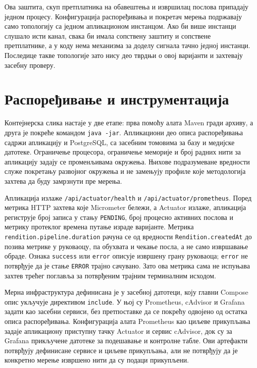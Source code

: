 \documentclass[12pt,oneside]{memoir}
\begin{document}
Ова заштита, скуп претплатника на обавештења и извршилац послова припадају
једном процесу. Конфигурација распоређивања и покретач мерења подржавају само
топологију са једном апликационом инстанцом. Ако би више инстанци слушало исти
канал, свака би имала сопствену заштиту и сопствене претплатнике, а у коду нема
механизма за доделу сигнала тачно једној инстанци. Последице такве топологије
зато нису део тврдњи о овој варијанти и захтевају засебну проверу.

\section{Распоређивање и инструментација}

Контејнерска слика настаје у две етапе: прва помоћу алата {\lat Maven} гради
архиву, а друга је покреће командом \texttt{java -jar}. Апликациони део описа
распоређивања садржи апликацију и {\lat PostgreSQL}, са засебним томовима за
базу и медијске датотеке. Ограничење процесора, ограничење меморије и број
радних нити за апликацију задају се променљивама окружења. Њихове
подразумеване вредности служе покретању развојног окружења и не замењују
профиле које методологија захтева да буду замрзнути пре мерења.


Апликација излаже \texttt{/api/actuator/health} и
\texttt{/api/actuator/prometheus}. Поред метрика {\lat HTTP} захтева које
{\lat Micrometer} бележи, а {\lat Actuator} излаже, апликација региструје број
записа у стању \texttt{PENDING}, број процесно активних послова и метрику
протеклог времена путање израде варијанте. Метрика
\texttt{rendition.pipeline.duration} рачуна се од вредности
\texttt{Rendition.createdAt} до позива метрике у руковаоцу, па обухвата и
чекање посла, а не само извршавање обраде. Ознака \texttt{success} или
\texttt{error} описује извршену грану руковаоца; \texttt{error} не потврђује
да је стање \texttt{ERROR} трајно сачувано. Зато ова метрика сама не испуњава
захтев трећег поглавља за потврђеним трајним терминалним исходом.

Мерна инфраструктура дефинисана је у засебној датотеци, коју главни
{\lat Compose} опис укључује директивом \texttt{include}. У њој су
{\lat Prometheus}, {\lat cAdvisor} и {\lat Grafana} задати као засебни сервиси,
без претпоставке да се покрећу одвојено од остатка описа распоређивања.
Конфигурација алата {\lat Prometheus} као циљеве прикупљања задаје апликациону
приступну тачку {\lat Actuator} и сервис {\lat cAdvisor}, док су за
{\lat Grafana} прикључене датотеке за подешавање и контролне табле. Ови
артефакти потврђују дефинисане сервисе и циљеве прикупљања, али не потврђују да
је конкретно мерење извршено нити да су подаци прикупљени.
\end{document}
